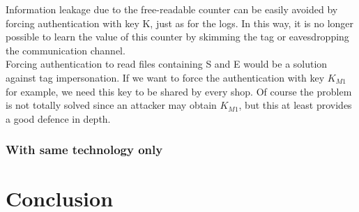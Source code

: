 \documentclass[a4paper,11pt,oneside]{article}
\begin{document}
Information leakage due to the free-readable counter can be easily avoided by forcing authentication with key K, just as for the logs. In this way, it is no longer possible to learn the value of this counter by skimming the tag or eavesdropping the communication channel. \\

Forcing authentication to read files containing S and E would be a solution against tag impersonation. If we want to force the authentication with key $K_{M1}$ for example, we need this key to be shared by every shop. Of course the problem is not totally solved since an attacker may obtain $K_{M1}$, but this at least provides a good defence in depth. \\

\subsubsection{With same technology only}

\section{Conclusion}
\end{document}
